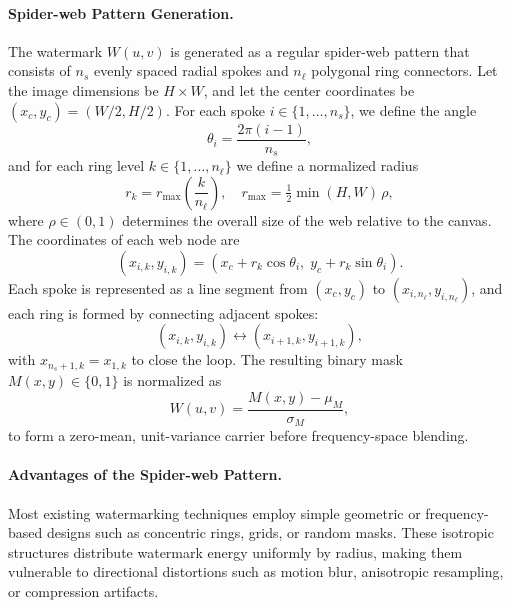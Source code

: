 \paragraph{Spider-web Pattern Generation.}
The watermark \(W(u,v)\) is generated as a regular spider-web pattern that consists of \(n_s\) evenly spaced radial spokes and \(n_\ell\) polygonal ring connectors.  
Let the image dimensions be \(H \times W\), and let the center coordinates be \((x_c,y_c)=(W/2,H/2)\).  
For each spoke \(i \in \{1,\ldots,n_s\}\), we define the angle
\begin{equation}
    \theta_i = \frac{2\pi(i-1)}{n_s},
\end{equation}
and for each ring level \(k \in \{1,\ldots,n_\ell\}\) we define a normalized radius
\begin{equation}
    r_k = r_{\max}\!\left(\frac{k}{n_\ell}\right), \quad r_{\max} = \tfrac{1}{2}\min(H,W)\,\rho,
\end{equation}
where \(\rho\in(0,1)\) determines the overall size of the web relative to the canvas.  
The coordinates of each web node are
\begin{equation}
    (x_{i,k},y_{i,k}) = (x_c + r_k\cos\theta_i,\; y_c + r_k\sin\theta_i).
\end{equation}
Each spoke is represented as a line segment from \((x_c,y_c)\) to \((x_{i,n_\ell},y_{i,n_\ell})\),  
and each ring is formed by connecting adjacent spokes:
\begin{equation}
    (x_{i,k},y_{i,k}) \longleftrightarrow (x_{i+1,k},y_{i+1,k}),
\end{equation}
with \(x_{n_s+1,k}=x_{1,k}\) to close the loop.  
The resulting binary mask \(M(x,y)\in\{0,1\}\) is normalized as
\begin{equation}
    W(u,v)=\frac{M(x,y)-\mu_M}{\sigma_M},
\end{equation}
to form a zero-mean, unit-variance carrier before frequency-space blending.

\paragraph{Advantages of the Spider-web Pattern.}
Most existing watermarking techniques employ simple geometric or frequency-based designs such as concentric rings, grids, or random masks. These isotropic structures distribute watermark energy uniformly by radius, making them vulnerable to directional distortions such as motion blur, anisotropic resampling, or compression artifacts.  

